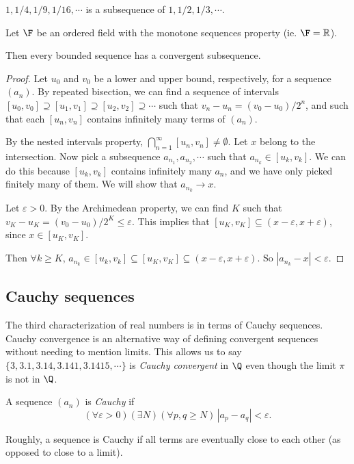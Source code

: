 \documentclass[a4paper]{article}
\begin{document}
\begin{eg}
  $1, 1/4, 1/9, 1/16, \cdots$ is a subsequence of $1, 1/2, 1/3, \cdots$.
\end{eg}


\begin{thm}
  Let $\F$ be an ordered field with the monotone sequences property (ie. $\F = \mathbb{R}$).

  Then every bounded sequence has a convergent subsequence.
\end{thm}

\begin{proof}
  Let $u_0$ and $v_0$ be a lower and upper bound, respectively, for a sequence $(a_n)$. By repeated bisection, we can find a sequence of intervals $[u_0, v_0] \supseteq [u_1, v_1]\supseteq [u_2,v_2] \supseteq\cdots$ such that $v_n - u_n = (v_0 - u_0)/2^n$, and such that each $[u_n, v_n]$ contains infinitely many terms of $(a_n)$.

  By the nested intervals property, $\bigcap_{n = 1}^\infty [u_n, v_n] \not= \emptyset$. Let $x$ belong to the intersection. Now pick a subsequence $a_{n_1}, a_{n_2}, \cdots$ such that $a_{n_k} \in [u_k, v_k]$. We can do this because $[u_k, v_k]$ contains infinitely many $a_n$, and we have only picked finitely many of them. We will show that $a_{n_k} \to x$.

  Let $\varepsilon > 0$. By the Archimedean property, we can find $K$ such that $v_K - u_K = (v_0 - u_0)/2^K \leq \varepsilon$. This implies that $[u_K, v_K] \subseteq (x - \varepsilon, x + \varepsilon)$, since $x\in [u_K, v_K]$.

  Then $\forall k \geq K$, $a_{n_k}\in [u_k, v_k] \subseteq [u_K, v_K] \subseteq (x - \varepsilon, x + \varepsilon)$. So $|a_{n_k} - x| < \varepsilon$.
\end{proof}

\subsection{Cauchy sequences}
The third characterization of real numbers is in terms of Cauchy sequences. Cauchy convergence is an alternative way of defining convergent sequences without needing to mention limits. This allows us to say $\{3, 3.1, 3.14, 3.141, 3.1415, \cdots\}$ is \emph{Cauchy convergent} in $\Q$ even though the limit $\pi$ is not in $\Q$.

\begin{defi}
  A sequence $(a_n)$ is \emph{Cauchy} if
  \[
    (\forall \varepsilon > 0)(\exists N)(\forall p, q\geq N)\, |a_p - a_q| < \varepsilon.
  \]
\end{defi}
Roughly, a sequence is Cauchy if all terms are eventually close to each other (as opposed to close to a limit).
\end{document}
